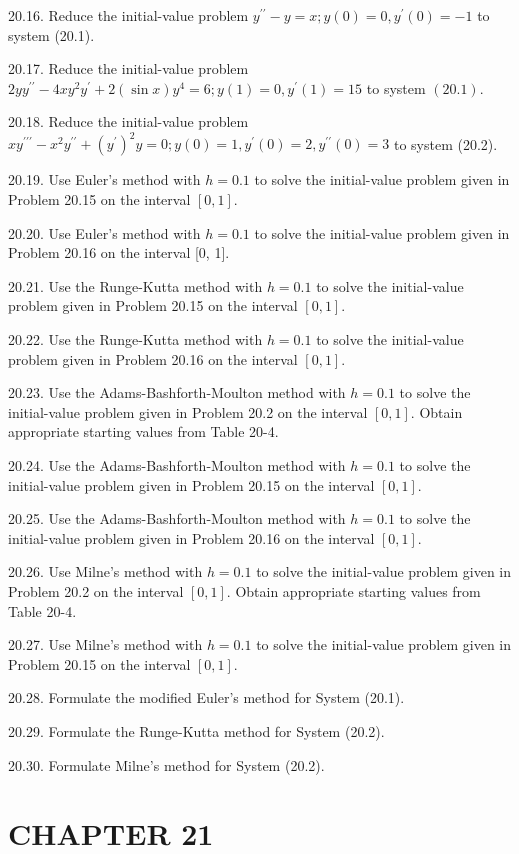\documentclass[10pt]{article}
\begin{document}
20.16. Reduce the initial-value problem $y^{\prime \prime}-y=x ; y(0)=0, y^{\prime}(0)=-1$ to system (20.1).

20.17. Reduce the initial-value problem $2 y y^{\prime \prime}-4 x y^{2} y^{\prime}+2(\sin x) y^{4}=6 ; y(1)=0, y^{\prime}(1)=15$ to system $(20.1)$.

20.18. Reduce the initial-value problem $x y^{\prime \prime \prime}-x^{2} y^{\prime \prime}+\left(y^{\prime}\right)^{2} y=0 ; y(0)=1, y^{\prime}(0)=2, y^{\prime \prime}(0)=3$ to system (20.2).

20.19. Use Euler's method with $h=0.1$ to solve the initial-value problem given in Problem 20.15 on the interval $[0,1]$.

20.20. Use Euler's method with $h=0.1$ to solve the initial-value problem given in Problem 20.16 on the interval [0, 1].

20.21. Use the Runge-Kutta method with $h=0.1$ to solve the initial-value problem given in Problem 20.15 on the interval $[0,1]$.

20.22. Use the Runge-Kutta method with $h=0.1$ to solve the initial-value problem given in Problem 20.16 on the interval $[0,1]$.

20.23. Use the Adams-Bashforth-Moulton method with $h=0.1$ to solve the initial-value problem given in Problem 20.2 on the interval $[0,1]$. Obtain appropriate starting values from Table 20-4.

20.24. Use the Adams-Bashforth-Moulton method with $h=0.1$ to solve the initial-value problem given in Problem 20.15 on the interval $[0,1]$.

20.25. Use the Adams-Bashforth-Moulton method with $h=0.1$ to solve the initial-value problem given in Problem 20.16 on the interval $[0,1]$.

20.26. Use Milne's method with $h=0.1$ to solve the initial-value problem given in Problem 20.2 on the interval $[0,1]$. Obtain appropriate starting values from Table 20-4.

20.27. Use Milne's method with $h=0.1$ to solve the initial-value problem given in Problem 20.15 on the interval $[0,1]$.

20.28. Formulate the modified Euler's method for System (20.1).

20.29. Formulate the Runge-Kutta method for System (20.2).

20.30. Formulate Milne's method for System (20.2).

\section*{CHAPTER 21}
\end{document}
